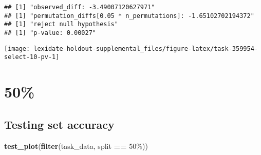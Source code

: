 \documentclass[
]{book}
\newenvironment{Shaded}{\begin{snugshade}}{\end{snugshade}}
\newcommand{\AttributeTok}[1]{\textcolor[rgb]{0.13,0.29,0.53}{#1}}
\newcommand{\DecValTok}[1]{\textcolor[rgb]{0.00,0.00,0.81}{#1}}
\newcommand{\FunctionTok}[1]{\textcolor[rgb]{0.13,0.29,0.53}{\textbf{#1}}}
\newcommand{\NormalTok}[1]{#1}
\newcommand{\OtherTok}[1]{\textcolor[rgb]{0.56,0.35,0.01}{#1}}
\newcommand{\SpecialCharTok}[1]{\textcolor[rgb]{0.81,0.36,0.00}{\textbf{#1}}}
\newcommand{\StringTok}[1]{\textcolor[rgb]{0.31,0.60,0.02}{#1}}
\begin{document}
\begin{Shaded}
\end{Shaded}

\begin{verbatim}
## [1] "observed_diff: -3.49007120627971"
## [1] "permutation_diffs[0.05 * n_permutations]: -1.65102702194372"
## [1] "reject null hypothesis"
## [1] "p-value: 0.00027"
\end{verbatim}

\texttt{[image: lexidate-holdout-supplemental\_files/figure-latex/task-359954-select-10-pv-1]}

\hypertarget{section-7}{%
\section{50\%}\label{section-7}}

\hypertarget{testing-set-accuracy-7}{%
\subsection{Testing set accuracy}\label{testing-set-accuracy-7}}

\begin{Shaded}
\begin{Highlighting}[]
\FunctionTok{test\_plot}\NormalTok{(}\FunctionTok{filter}\NormalTok{(task\_data, split }\SpecialCharTok{==} \StringTok{\textquotesingle{}50\%\textquotesingle{}}\NormalTok{))}
\end{Highlighting}
\end{Shaded}
\end{document}
